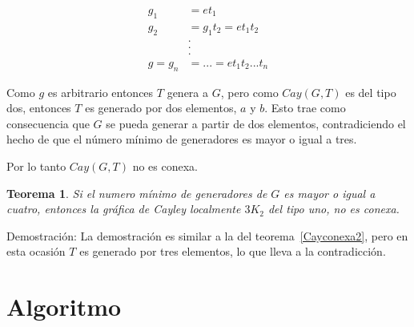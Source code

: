 \documentclass[12pt]{book}
\newtheorem{theorem}{Teorema}
\theoremstyle{definition}
\begin{document}
\begin{equation*}
  \begin{split}
    g_1&=et_1\\
    g_2&=g_1t_2=et_1t_2\\
    &  .\\
    &  .\\
    &  .\\
    g=g_n&=...=et_1t_2...t_n
  \end{split}
\end{equation*}

Como $g$ es arbitrario entonces $T$ genera a $G$, pero como $Cay(G,T)$
es del tipo dos, entonces $T$ es generado por dos elementos, $a$ y
$b$. Esto trae como consecuencia que $G$ se pueda generar a partir de
dos elementos, contradiciendo el hecho de que el número mínimo de
generadores es mayor o igual a tres.

Por lo tanto $Cay(G,T)$ no es conexa. 

\begin{theorem}\label{Cayconexa1}
  Si el numero mínimo de generadores de $G$ es mayor o igual a cuatro,
  entonces la gráfica de Cayley localmente $3K_2$ del tipo uno, no es
  conexa.
\end{theorem}

Demostración: La demostración es similar a la del
teorema~\ref{Cayconexa2}, pero en esta ocasión $T$ es generado por
tres elementos, lo que lleva a la contradicción.

\section{Algoritmo}
\end{document}
